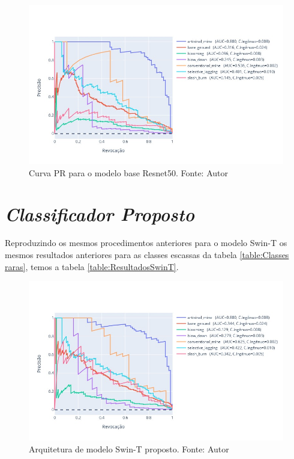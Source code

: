 \begin{figure}[!ht]
    \centering
    \includegraphics[width=\columnwidth]{Imagens/results/rsp-resnet-50_planet_pt/Curva PR para classes raras.jpg}
    \caption{ Curva PR para o modelo base Resnet50.
    Fonte: Autor}
   \label{fig:CurvaPRResnet50}
\end{figure}   

   


\section{\textit{Classificador Proposto}}\label{sec:Cap4_ClassifiadorProposto}

Reproduzindo os mesmos procedimentos anteriores para o modelo Swin-T os mesmos resultados anteriores para as classes escassas da tabela \ref{table:Classes raras}, temos a tabela \ref{table:ResultadosSwinT}. 

\begin{figure}[!ht]
    \centering
    \includegraphics[width=\columnwidth]{Imagens/results/rsp-swin-t_planet_pt/Curva PR para classes raras.jpg}
    \caption{ Arquitetura de modelo Swin-T proposto.
    Fonte: Autor}
    \label{fig:CurvaPRSwint}
\end{figure}   

